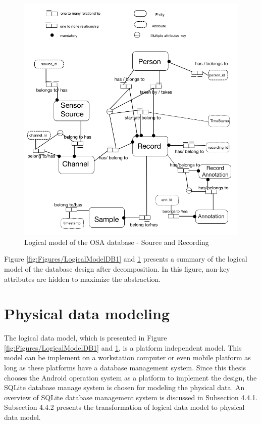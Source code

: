 \begin{figure}[ht]
    \centering
    \includegraphics[width=1.0\textwidth]{Figures/LogicalModelDB2.png}
    \caption{Logical model of the OSA database - Source and Recording}
    \label{fig:Figures/LogicalModelDB2}
\end{figure}
Figure \ref{fig:Figures/LogicalModelDB1} and \ref{fig:Figures/LogicalModelDB2} presents a summary of the logical model of the database design after decomposition. In this figure, non-key attributes are hidden to maximize the abstraction.
\section{Physical data modeling}
The logical data model, which is presented in Figure \ref{fig:Figures/LogicalModelDB1} and \ref{fig:Figures/LogicalModelDB2}, is a platform independent model. This model can be implement on a workstation computer or even mobile platform as long as these platforms have a database management system. Since this thesis chooses the Android operation system as a platform to implement the design, the SQLite database manage system is chosen for modeling the physical data. An overview of SQLite database management system is discussed in Subsection 4.4.1. Subsection 4.4.2 presents the transformation of logical data model to physical data model.
